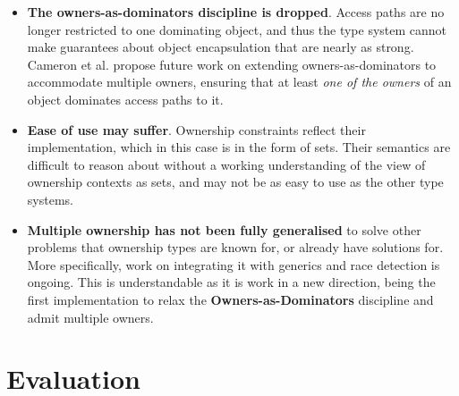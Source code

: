 \documentclass{acm_proc_article-sp}
\begin{document}
\begin{itemize}

	\item \textbf{The owners-as-dominators discipline is dropped}. Access paths
		are no longer restricted to one dominating object, and thus the type
		system cannot make guarantees about object encapsulation that are nearly
		as strong. Cameron et al. propose future work on extending
		owners-as-dominators to accommodate multiple owners, ensuring that at
		least \textit{one of the owners} of an object dominates access paths to
		it.

	\item \textbf{Ease of use may suffer}. Ownership constraints reflect their
		implementation, which in this case is in the form of sets. Their
		semantics are difficult to reason about without a working understanding
		of the view of ownership contexts as sets, and may not be as easy to use
		as the other type systems.

	\item \textbf{Multiple ownership has not been fully generalised} to solve
		other problems that ownership types are known for, or already have
		solutions for. More specifically, work on integrating it with generics
		and race detection is ongoing. This is understandable as it is work in
		a new direction, being the first implementation to relax the
		\textbf{Owners-as-Dominators} discipline and admit multiple owners.

\end{itemize}

\section{Evaluation}
\label{sec:eval}
\end{document}
